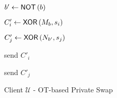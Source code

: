 \noindent
\begin{figure} [H]
    \begin{minipage}{0.5\textwidth}
        \begin{algorithm}[H]
            \LinesNumbered
            \caption{Client $ \mathcal{U} $ - \newline OT-based Private Swap}
            \label{algo:ClientOTPS}
    
            \KwOut{\phantom{$ C_i, C_j $}}
    
            \vspace*{0.48cm}
    
            \phantom{$ M_0 \gets \XOR \left( D'_i, s'_i \right) $}
    
            \phantom{$ M_0 \gets \XOR \left( D'_j, s'_i \right) $}
    
    
            \phantom{$ N_0 \gets \XOR \left( D'_i, s'_j \right) $}
    
            \phantom{$ N_1 \gets \XOR \left( D'_j, s'_j \right) $}
    
            $ b' \gets \mathsf{{NOT}} \left( b \right) $
    
    
            $ C'_i \gets \mathsf{{XOR}} \left( M_b, s_i \right) $
    
            $ C'_j \gets \mathsf{{XOR}} \left( N_{b'}, s_j \right) $
    
            send $ C'_i $
    
            send $ C'_j $
    
            \phantom{$ C_i \gets \XOR \left( C'_i, s'_i \right) $}
    
            \phantom{$ C_j \gets \XOR \left( C'_j, s'_j \right) $}
    
            \vspace*{0.48cm}
    
            \KwRet{}
    

\end{algorithm}
\end{minipage}
\end{figure}
